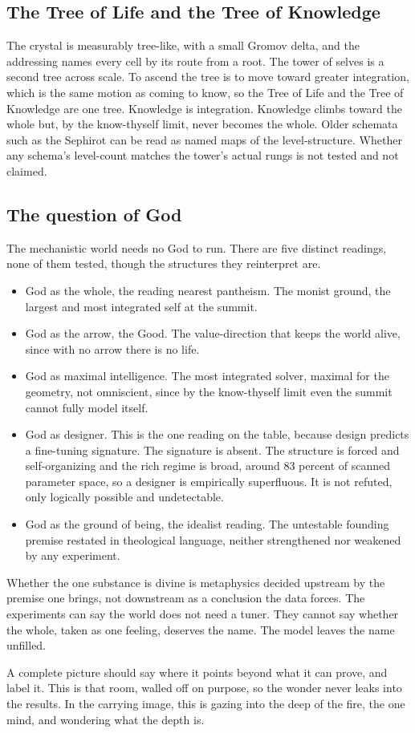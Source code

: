 \subsection{The Tree of Life and the Tree of Knowledge}

The crystal is measurably tree-like, with a small Gromov delta, and the addressing names every cell by its route
from a root. The tower of selves is a second tree across scale. To ascend the tree is to move toward greater
integration, which is the same motion as coming to know, so the Tree of Life and the Tree of Knowledge are one
tree. Knowledge is integration. Knowledge climbs toward the whole but, by the know-thyself limit, never becomes
the whole. Older schemata such as the Sephirot can be read as named maps of the level-structure. Whether any
schema's level-count matches the tower's actual rungs is not tested and not claimed.

\subsection{The question of God}

The mechanistic world needs no God to run. There are five distinct readings, none of them tested, though the
structures they reinterpret are.

\begin{itemize}
  \item God as the whole, the reading nearest pantheism. The monist ground, the largest and most integrated self
  at the summit.
  \item God as the arrow, the Good. The value-direction that keeps the world alive, since with no arrow there is
  no life.
  \item God as maximal intelligence. The most integrated solver, maximal for the geometry, not omniscient, since
  by the know-thyself limit even the summit cannot fully model itself.
  \item God as designer. This is the one reading on the table, because design predicts a fine-tuning signature.
  The signature is absent. The structure is forced and self-organizing and the rich regime is broad, around $83$
  percent of scanned parameter space, so a designer is empirically superfluous. It is not refuted, only logically
  possible and undetectable.
  \item God as the ground of being, the idealist reading. The untestable founding premise restated in theological
  language, neither strengthened nor weakened by any experiment.
\end{itemize}

Whether the one substance is divine is metaphysics decided upstream by the premise one brings, not downstream as a
conclusion the data forces. The experiments can say the world does not need a tuner. They cannot say whether the
whole, taken as one feeling, deserves the name. The model leaves the name unfilled.


A complete picture should say where it points beyond what it can prove, and label it. This is that room, walled
off on purpose, so the wonder never leaks into the results. In the carrying image, this is gazing into the deep of
the fire, the one mind, and wondering what the depth is.
